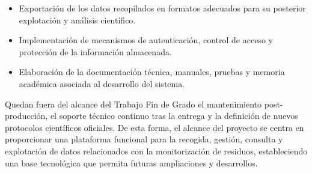 \begin{itemize}
    \item Exportación de los datos recopilados en formatos adecuados para su
    posterior explotación y análisis científico.

    \item Implementación de mecanismos de autenticación, control de acceso y
    protección de la información almacenada.

    \item Elaboración de la documentación técnica, manuales, pruebas y memoria
    académica asociada al desarrollo del sistema.
\end{itemize}

Quedan fuera del alcance del Trabajo Fin de Grado el mantenimiento
post-producción, el soporte técnico continuo tras la entrega y la definición de
nuevos protocolos científicos oficiales. De esta forma, el alcance del proyecto
se centra en proporcionar una plataforma funcional para la recogida, gestión,
consulta y explotación de datos relacionados con la monitorización de residuos,
estableciendo una base tecnológica que permita futuras ampliaciones y desarrollos.